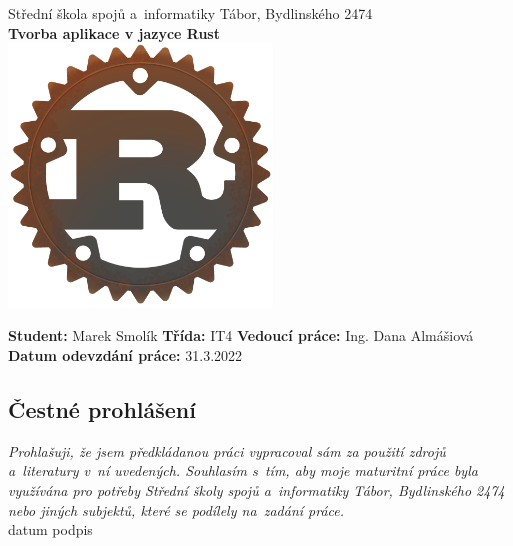 \documentclass[a4paper, 12pt, twoside]{article} %
\begin{document}
\thispagestyle{empty}
\begin{center}
	{\LARGE Střední škola spojů a~informatiky Tábor, Bydlinského 2474} \\[1.5cm]
	\textbf{\LARGE Tvorba aplikace v jazyce Rust} \\ [4cm]
	\includegraphics[width=7cm]{logo_alt.png}
\end{center}

\vspace*{\fill}

\begin{flushleft}
	\large
	\textbf{Student: }Marek Smolík              \newline
	\textbf{Třída: }IT4                         \newline
	\textbf{Vedoucí práce: }Ing. Dana Almášiová \newline
	\textbf{Datum odevzdání práce: } 31.3.2022
\end{flushleft}
\vfill

\newpage
\thispagestyle{empty}
\vspace*{\fill}


\subsection*{Čestné prohlášení}
	\noindent \textit{Prohlašuji, že jsem předkládanou práci vypracoval sám za použití zdrojů a~literatury v~ní uvedených. Souhlasím s~tím, aby moje maturitní práce byla využívána pro potřeby Střední školy spojů a~informatiky Tábor, Bydlinského 2474 nebo jiných subjektů, které se podílely na~zadání práce.} \\[1.5cm]
	\noindent \makebox[3cm]{\dotfill} \hfill \makebox[3cm]{\dotfill} \newline
	\noindent datum \hfill podpis

\newpage
\end{document}
